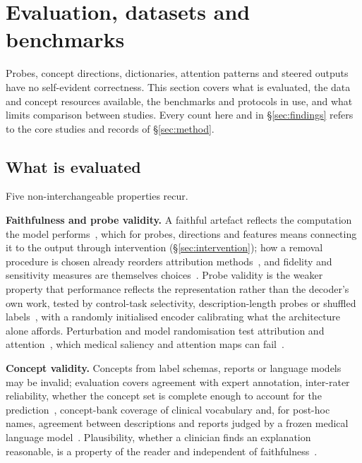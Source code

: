 \section{Evaluation, datasets and benchmarks}
\label{sec:evaluation}

Probes, concept directions, dictionaries, attention patterns and steered outputs have no self-evident
correctness. This section covers what is evaluated, the data and concept resources available, the
benchmarks and protocols in use, and what limits comparison between studies. Every count here and in \S\ref{sec:findings} refers to the \Ncore{} core studies and \Nclaims{}
records of \S\ref{sec:method}.

\subsection{What is evaluated}
\label{sec:eval-what}

Five non-interchangeable properties recur.

\textbf{Faithfulness and probe validity.} A faithful artefact reflects the computation the model
performs~\cite{jacovi2020towards}, which for probes, directions and features means connecting it to the
output through intervention (\S\ref{sec:intervention}); how a removal procedure is chosen already reorders
attribution methods~\cite{hooker2019benchmark}, and fidelity and sensitivity measures are themselves
choices~\cite{yeh2019fidelity}. Probe validity is the weaker property that performance
reflects the representation rather than the decoder's own work, tested by control-task selectivity,
description-length probes or shuffled labels~\cite{hewitt2019designing,voita2020information}, with a
randomly initialised encoder calibrating what the architecture alone affords. Perturbation and model
randomisation test attribution and attention~\cite{adebayo2018sanity}, which medical saliency and attention
maps can fail~\cite{arun2021trustworthiness,sadanandan2026attention}.

\textbf{Concept validity.} Concepts from label schemas, reports or language models may be
invalid; evaluation covers agreement with expert annotation, inter-rater reliability, whether the concept
set is complete enough to account for the prediction~\cite{yeh2019completeness}, concept-bank coverage of
clinical vocabulary and, for post-hoc names, agreement between descriptions and reports judged by a frozen
medical language model~\cite{haque2026medconcept}. Plausibility, whether a clinician finds an
explanation reasonable, is a property of the reader and independent of
faithfulness~\cite{jacovi2020towards,miller2017explanation}.


